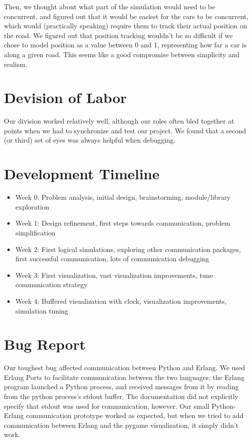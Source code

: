 \documentclass{article}
\begin{document}
Then, we thought about what part of the simulation would need to be concurrent, and figured out that it would be easiest for the cars to be concurrent, which would (practically speaking) require them to track their actual position on the road. We figured out that position tracking wouldn't be so difficult if we chose to model position as a value between 0 and 1, representing how far a car is along a given road. This seems like a good compromise between simplicity and realism.

\section{Devision of Labor}

Our division worked relatively well, although our roles often bled together at points when we had to synchronize and test our project. We found that a second (or third) set of eyes was always helpful when debugging.

\section{Development Timeline}

\begin{itemize}
	
	\item Week 0: Problem analysis, initial design, brainstorming, module/library exploration
	\item Week 1: Design refinement, first steps towards communication, problem simplification
	\item Week 2: First logical simulations, exploring other communication packages, first successful communication, lots of communication debugging
	\item Week 3: First visualization, vast visualization improvements, tune communication strategy
	\item Week 4: Buffered visualization with clock, visualization improvements, simulation tuning
	
\end{itemize}

\section{Bug Report}

Our toughest bug affected communication between Python and Erlang. We used Erlang Ports to facilitate communication between the two languages; the Erlang program launched a Python process, and received messages from it by reading from the python process’s stdout buffer. The documentation did not explicitly specify that stdout was used for communication, however. Our small Python-Erlang communication prototype worked as expected, but when we tried to add communication between Erlang and the pygame visualization, it simply didn't work. 
\end{document}
